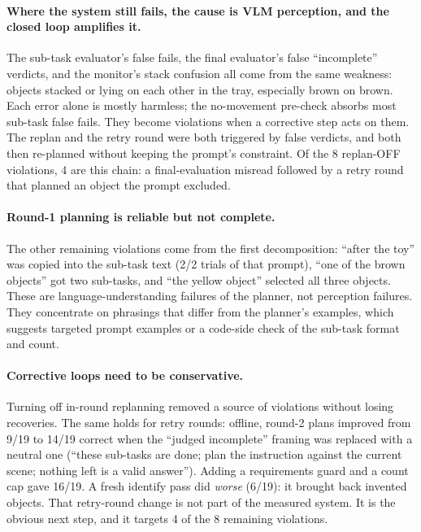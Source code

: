 \paragraph{Where the system still fails, the cause is VLM perception, and the closed loop
amplifies it.} The sub-task evaluator's false fails, the final evaluator's false
``incomplete'' verdicts, and the monitor's stack confusion all come from the same
weakness: objects stacked or lying on each other in the tray, especially brown on brown.
Each error alone is mostly harmless; the no-movement pre-check absorbs most sub-task false
fails. They become violations when a corrective step acts on them. The replan and the
retry round were both triggered by false verdicts, and both then re-planned without
keeping the prompt's constraint. Of the 8 replan-OFF violations, 4 are this chain: a
final-evaluation misread followed by a retry round that planned an object the prompt
excluded.

\paragraph{Round-1 planning is reliable but not complete.} The other remaining violations
come from the first decomposition: ``after the toy'' was copied into the sub-task text
(2/2 trials of that prompt), ``one of the brown objects'' got two sub-tasks, and ``the
yellow object'' selected all three objects. These are language-understanding failures of
the planner, not perception failures. They concentrate on phrasings that differ from the
planner's examples, which suggests targeted prompt examples or a code-side check of the
sub-task format and count.

\paragraph{Corrective loops need to be conservative.} Turning off in-round replanning
removed a source of violations without losing recoveries. The same holds for retry rounds:
offline, round-2 plans improved from 9/19 to 14/19 correct when the ``judged incomplete''
framing was replaced with a neutral one (``these sub-tasks are done; plan the instruction
against the current scene; nothing left is a valid answer''). Adding a requirements guard
and a count cap gave 16/19. A fresh identify pass did \emph{worse} (6/19): it brought back
invented objects. That retry-round change is not part of the measured system. It is the
obvious next step, and it targets 4 of the 8 remaining violations.

